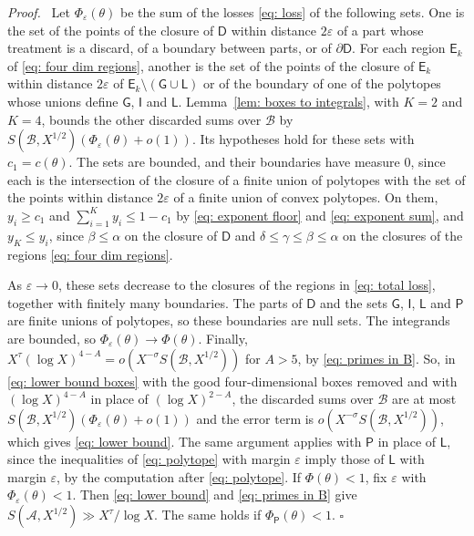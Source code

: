 \documentclass{article}
\numberwithin{equation}{section}
\newenvironment{proof}[1][Proof]{\par\medskip\noindent\textit{#1.}\ }{\hfill$\square$\par\medskip}
\newcommand{\Le}{\leqslant}
\newcommand{\Ge}{\geqslant}
\begin{document}
\begin{proof}
Let $\Phi_\varepsilon(\theta)$ be the sum of the losses \eqref{eq: loss} of the following sets. One is the set of the points of the closure of $\mathsf{D}$ within distance $2\varepsilon$ of a part whose treatment is a discard, of a boundary between parts, or of $\partial\mathsf{D}$. For each region $\mathsf{E}_k$ of \eqref{eq: four dim regions}, another is the set of the points of the closure of $\mathsf{E}_k$ within distance $2\varepsilon$ of $\mathsf{E}_k \setminus (\mathsf{G} \cup \mathsf{L})$ or of the boundary of one of the polytopes whose unions define $\mathsf{G}$, $\mathsf{I}$ and $\mathsf{L}$. Lemma~\ref{lem: boxes to integrals}, with $K = 2$ and $K = 4$, bounds the other discarded sums over $\mathcal{B}$ by $S(\mathcal{B}, X^{1/2})(\Phi_\varepsilon(\theta) + o(1))$. Its hypotheses hold for these sets with $c_1 = c(\theta)$. The sets are bounded, and their boundaries have measure $0$, since each is the intersection of the closure of a finite union of polytopes with the set of the points within distance $2\varepsilon$ of a finite union of convex polytopes. On them, $y_i \Ge c_1$ and $\sum_{i=1}^{K} y_i \Le 1 - c_1$ by \eqref{eq: exponent floor} and \eqref{eq: exponent sum}, and $y_K \Le y_i$, since $\beta \Le \alpha$ on the closure of $\mathsf{D}$ and $\delta \Le \gamma \Le \beta \Le \alpha$ on the closures of the regions \eqref{eq: four dim regions}.

As $\varepsilon \to 0$, these sets decrease to the closures of the regions in \eqref{eq: total loss}, together with finitely many boundaries. The parts of $\mathsf{D}$ and the sets $\mathsf{G}$, $\mathsf{I}$, $\mathsf{L}$ and $\mathsf{P}$ are finite unions of polytopes, so these boundaries are null sets. The integrands are bounded, so $\Phi_\varepsilon(\theta) \to \Phi(\theta)$. Finally, $X^{\tau}(\log X)^{4 - A} = o(X^{-\sigma} S(\mathcal{B}, X^{1/2}))$ for $A > 5$, by \eqref{eq: primes in B}. So, in \eqref{eq: lower bound boxes} with the good four-dimensional boxes removed and with $(\log X)^{4 - A}$ in place of $(\log X)^{2 - A}$, the discarded sums over $\mathcal{B}$ are at most $S(\mathcal{B}, X^{1/2})(\Phi_\varepsilon(\theta) + o(1))$ and the error term is $o(X^{-\sigma} S(\mathcal{B}, X^{1/2}))$, which gives \eqref{eq: lower bound}. The same argument applies with $\mathsf{P}$ in place of $\mathsf{L}$, since the inequalities of \eqref{eq: polytope} with margin $\varepsilon$ imply those of $\mathsf{L}$ with margin $\varepsilon$, by the computation after \eqref{eq: polytope}. If $\Phi(\theta) < 1$, fix $\varepsilon$ with $\Phi_\varepsilon(\theta) < 1$. Then \eqref{eq: lower bound} and \eqref{eq: primes in B} give $S(\mathcal{A}, X^{1/2}) \gg X^{\tau}/\log X$. The same holds if $\Phi_{\mathsf{P}}(\theta) < 1$.
\end{proof}
\end{document}

